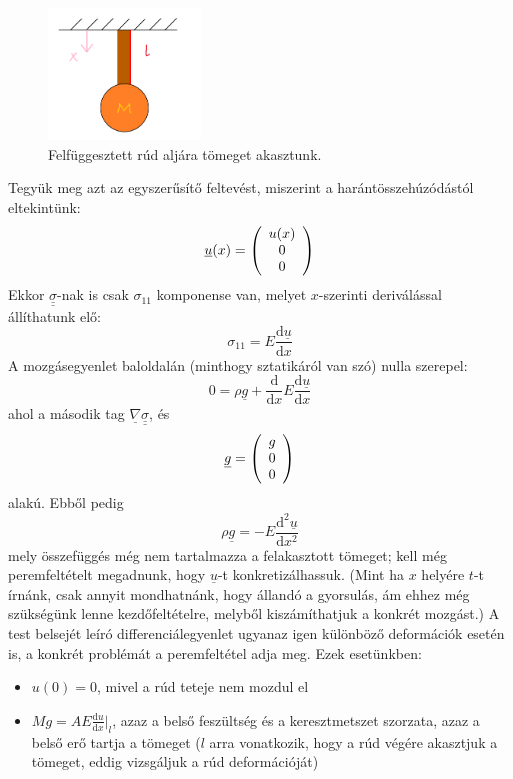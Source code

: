 \documentclass[a4paper, 12pt, titlepage]{article}
\begin{document}
	\begin{figure}[!h]
	\includegraphics[height=3.5cm]{./pelda.png} %
	\centering
	\caption{Felfüggesztett rúd aljára tömeget akasztunk.}
	\label{fig:pelda}
	\end{figure}
\newline
Tegyük meg azt az egyszerűsítő feltevést, miszerint a harántösszehúzódástól eltekintünk:
	\[ \underline{u}(x)=\left(
	\begin{array}{c}
	$$u(x)$$\\
	0\\
	0
	\end{array}\right) \]
Ekkor $\underline{\underline{\sigma}}$-nak is csak $\sigma_{11}$ komponense van, melyet $x$-szerinti deriválással állíthatunk elő:
\[\sigma_{11}=E\frac{\mathrm{d}\underline{u}}{\mathrm{d}x}\]
A mozgásegyenlet baloldalán (minthogy sztatikáról van szó) nulla szerepel:
\[0=\rho\underline{g}+\frac{\mathrm{d}}{\mathrm{d}x}E\frac{\mathrm{d}\underline{u}}{\mathrm{d}x}\]
ahol a második tag $\underline{\nabla}\underline{\underline{\sigma}}$, és
	\[ \underline{g}=\left(
	\begin{array}{c}
	$$g$$\\
	0\\
	0
	\end{array}\right) \]
alakú. Ebből pedig
\[\rho\underline{g}=-E\frac{\mathrm{d}^{2}\underline{u}}{\mathrm{d}x^{2}}\]
mely összefüggés még nem tartalmazza a felakasztott tömeget; kell még peremfeltételt megadnunk, hogy $\underline{u}$-t konkretizálhassuk. (Mint ha $x$ helyére $t$-t írnánk, csak annyit mondhatnánk, hogy állandó a gyorsulás, ám ehhez még szükségünk lenne kezdőfeltételre, melyből kiszámíthatjuk a konkrét mozgást.) A test belsejét leíró differenciálegyenlet ugyanaz igen különböző deformációk esetén is, a konkrét problémát a peremfeltétel adja meg. Ezek esetünkben:
	\begin{itemize}
		\item $u(0)=0$, mivel a rúd teteje nem mozdul el
		\item $Mg=AE\frac{\mathrm{d}u}{\mathrm{d}x}\Big|_{l}$, azaz a belső feszültség és a keresztmetszet szorzata, azaz a belső erő tartja a tömeget ($l$ arra vonatkozik, hogy a rúd végére akasztjuk a tömeget, eddig vizsgáljuk a rúd deformációját)
	\end{itemize}
\end{document}
